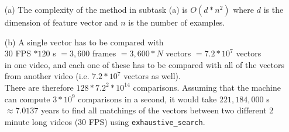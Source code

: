 \documentclass [a4paper, 11pt] {article}
\begin{document}
\begin{enumerate}
	\item[(a)] The complexity of the method in subtask (a) is $O(d*n^2)$ where $d$ is the dimension of feature vector and $n$ is the number of examples.
		
	\item[(b)] A single vector has to be compared with \\
	$30$ FPS $* 120$ s $= 3,600$ frames $= 3,600 * N$ vectors $= 7.2 * 10^7$ vectors \\
	in one video, and each one of these has to be compared with all of the vectors from another video (i.e. $7.2 * 10^7$ vectors as well).\\
	There are therefore $128 * {7.2}^2 * 10^{14}$ comparisons. Assuming that the machine can compute $3 * 10^9$ comparisons in a second, it would take $221,184,000$ s $\approx 7.0137$ years to find all matchings of the vectors between two different 2 minute long videos ($30$ FPS) using \texttt{exhaustive\_search}.
	

\end{enumerate}
\end{document}
